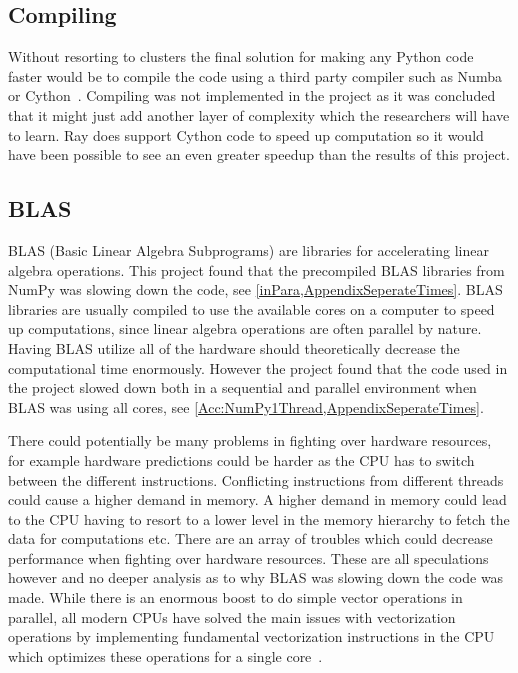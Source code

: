 \documentclass[12pt, a4paper]{article}
\begin{document}
\subsection{Compiling}

Without resorting to clusters the final solution for making any Python code faster would be to compile the code using a third party compiler such as Numba or Cython~\cite{matEval}.
Compiling was not implemented in the project as it was concluded that it might just add another layer of complexity which the researchers will have to learn.
Ray does support Cython code to speed up computation so it would have been possible to see an even greater speedup than the results of this project.

\subsection{BLAS}

BLAS (Basic Linear Algebra Subprograms) are libraries for accelerating linear algebra operations.
This project found that the precompiled BLAS libraries from NumPy was slowing down the code, see \cref{inPara,AppendixSeperateTimes}.
BLAS libraries are usually compiled to use the available cores on a computer to speed up computations, since linear algebra operations are often parallel by nature.
Having BLAS utilize all of the hardware should theoretically decrease the computational time enormously.
However the project found that the code used in the project slowed down both in a sequential and parallel environment when BLAS was using all cores, see \cref{Acc:NumPy1Thread,AppendixSeperateTimes}.

There could potentially be many problems in fighting over hardware resources, for example hardware predictions could be harder as the CPU has to switch between the different instructions.
Conflicting instructions from different threads could cause a higher demand in memory.
A higher demand in memory could lead to the CPU having to resort to a lower level in the memory hierarchy to fetch the data for computations etc. 
There are an array of troubles which could decrease performance when fighting over hardware resources.
These are all speculations however and no deeper analysis as to why BLAS was slowing down the code was made.
While there is an enormous boost to do simple vector operations in parallel, all modern CPUs have solved the main issues with vectorization operations by implementing fundamental vectorization instructions in the CPU which optimizes these operations for a single core~\cite{enwiki:avx,AgnerFog:avx,Intel:avx}.
\end{document}
